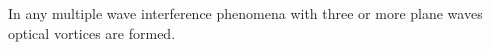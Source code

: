 In any multiple wave interference phenomena with three or more plane
waves optical vortices are formed.  


